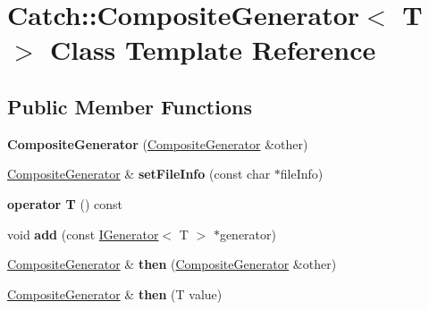 \hypertarget{class_catch_1_1_composite_generator}{}\section{Catch\+:\+:Composite\+Generator$<$ T $>$ Class Template Reference}
\label{class_catch_1_1_composite_generator}
\subsection*{Public Member Functions}
\begin{DoxyCompactItemize}
\item 
\mbox{\label{class_catch_1_1_composite_generator_a21a7070a00e4a6fe021294c356692692}} 
{\bfseries Composite\+Generator} (\hyperlink{class_catch_1_1_composite_generator}{Composite\+Generator} \&other)
\item 
\mbox{\label{class_catch_1_1_composite_generator_ac3c57cf4ca5472f440bf71e2936bcd4a}} 
\hyperlink{class_catch_1_1_composite_generator}{Composite\+Generator} \& {\bfseries set\+File\+Info} (const char $\ast$file\+Info)
\item 
\mbox{\label{class_catch_1_1_composite_generator_a83d6c941e2e735b9528e6e832f7b76e7}} 
{\bfseries operator T} () const
\item 
\mbox{\label{class_catch_1_1_composite_generator_af3774d42ad2d3453d089ca599efe0517}} 
void {\bfseries add} (const \hyperlink{struct_catch_1_1_i_generator}{I\+Generator}$<$ T $>$ $\ast$generator)
\item 
\mbox{\label{class_catch_1_1_composite_generator_a2e03f42df85cdd238aabd77a80b075d5}} 
\hyperlink{class_catch_1_1_composite_generator}{Composite\+Generator} \& {\bfseries then} (\hyperlink{class_catch_1_1_composite_generator}{Composite\+Generator} \&other)
\item 
\mbox{\label{class_catch_1_1_composite_generator_aefdc11bcfccdf07d2db5f0da3ed8758c}} 
\hyperlink{class_catch_1_1_composite_generator}{Composite\+Generator} \& {\bfseries then} (T value)
\end{DoxyCompactItemize}


